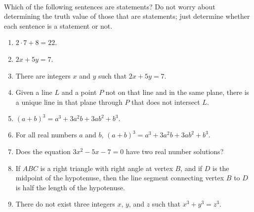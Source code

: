 \begin{prog} \label{prog:statements2} \hfill \\
Which of the following sentences are statements?  Do not worry about determining the truth value of those that are statements; just determine whether each sentence is a statement or not.

\begin{multicols}{2}
\begin{enumerate}

\item $2 \cdot 7 + 8 = 22$.


\item $2x + 5y = 7$.\label{PA:prop3}
\end{enumerate}
\end{multicols}
\begin{enumerate} \setcounter{enumi}{2}
\item There are integers  $x$  and  $y$  such that $2x + 5y = 7.$\label{PA:prop4}



\item Given a line  $L$  and a point  $P$  not on that line and in the same plane, there is a unique line in that plane through  $P$  that does not intersect  $L$.

\item $\left( {a + b} \right)^3  = a^3 + 3a^2b + 3ab^2  + b^3.$\label{PA:prop8}

\item For all real numbers $a$ and $b$, $\left( {a + b} \right)^3  = a^3  + 3a^2b + 3ab^2 + b^3$.
\label{PA:prop9}


\item Does the equation $3x^2 - 5x - 7 = 0$ have two real number solutions?

\item If $ABC$ is a right triangle with right angle at vertex $B$, and if $D$ is the midpoint of the hypotenuse, then the line segment connecting vertex $B$ to $D$ is half the length of the hypotenuse.


\item There do not exist three integers  $x$, $y$, and  $z$ such that 
 $x^3  + y^3  = z^3.$
\end{enumerate}
\end{prog}
\hbreak

\endinput
